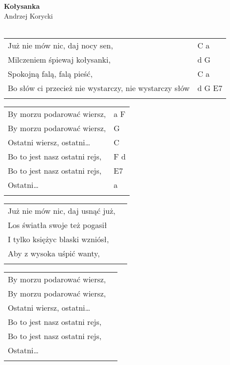\documentclass[a5paper]{article}
\begin{document}


\noindent
\fontsize{12pt}{15pt}\selectfont
\textbf{Kołysanka} \\
\fontsize{8pt}{10pt}\selectfont
Andrzej Korycki \\ \\
\fontsize{10pt}{12pt}\selectfont
{}
\begin{tabular}{@{}p{9.00cm}p{3cm}@{}}
\noindent
Już nie mów nic, daj nocy sen, & C a \\
Milczeniem śpiewaj kołysanki, & d G \\
Spokojną falą, falą pieść, & C a \\
Bo słów ci przecież nie wystarczy, nie wystarczy słów & d G E7 \\ \\
\end{tabular}

\noindent
\begin{tabular}{@{}p{8.00cm}p{3cm}@{}}
	By morzu podarować wiersz, & a F \\
	By morzu podarować wiersz, & G \\
	Ostatni wiersz, ostatni… & C \\
	Bo to jest nasz ostatni rejs, & F d \\
	Bo to jest nasz ostatni rejs, & E7 \\
	Ostatni… & a \\ \\
\end{tabular}

\noindent
\begin{tabular}{@{}p{8.00cm}p{3cm}@{}}
Już nie mów nic, daj usnąć już,	\\
Los światła swoje też pogasił \\
I tylko księżyc blaski wzniósł,	\\
Aby z wysoka uśpić wanty, \\ \\
\end{tabular}

\noindent
\begin{tabular}{@{}p{8.00cm}p{3cm}@{}}
By morzu podarować wiersz, \\
By morzu podarować wiersz, \\
Ostatni wiersz, ostatni… \\
Bo to jest nasz ostatni rejs, \\
Bo to jest nasz ostatni rejs, \\
Ostatni… \\ \\
\end{tabular}
\end{document}
